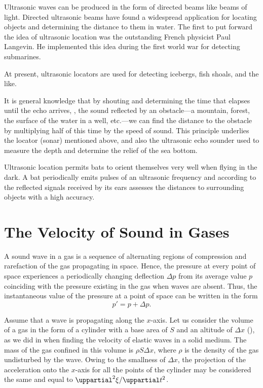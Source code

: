 Ultrasonic waves can be produced in the form of directed beams like beams of light.
Directed ultrasonic beams have found a widespread application for locating objects and determining the distance to them in water.
The first to put forward the idea of ultrasonic location was the outstanding French physicist Paul Langevin.
He implemented this idea during the first world war for detecting submarines.


At present, ultrasonic locators are used for detecting icebergs, fish shoals, and the like.

It is general knowledge that by shouting and determining the time that elapses until the echo arrives, \ie, the sound reflected by an obstacle---a mountain, forest, the surface of the water in a well, etc.---we can find the distance to the obstacle by multiplying half of this time by the speed of sound.
This principle underlies the locator (sonar) mentioned above, and also the ultrasonic echo sounder used to measure the depth and determine the relief of the sea bottom.

Ultrasonic location permits bats to orient themselves very well when flying in the dark.
A bat periodically emits pulses of an ultrasonic frequency and according to the reflected signals received by its ears assesses the distances to surrounding objects with a high accuracy.

\section{The Velocity of Sound in Gases}\label{sec:14_10}

A sound wave in a gas is a sequence of alternating regions of compression and rarefaction of the gas propagating in space.
Hence, the pressure at every point of space experiences a periodically changing deflection $\Delta{p}$ from its average value $p$ coinciding with the pressure existing in the gas when waves are
absent.
Thus, the instantaneous value of the pressure at a point of space can be written in the form
\begin{equation*}
	p' = p + \Delta{p}.
\end{equation*}

Assume that a wave is propagating along the $x$-axis.
Let us consider the volume of a gas in the form of a
cylinder with a base area of $S$ and an altitude of $\Delta{x}$ (), as we did in  when finding the velocity of elastic waves in a solid medium.
The mass of the gas confined in this volume is $\rho S\Delta{x}$, where $\rho$ is the density of the gas undisturbed by the wave.
Owing to the smallness of $\Delta{x}$, the projection of the acceleration onto the $x$-axis
for all the points of the cylinder may be considered the same and equal to $\diffnpartialin{\xi}{t}2$.

